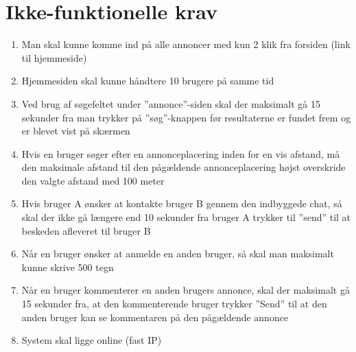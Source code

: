 \chapter{Ikke-funktionelle krav}

\begin{enumerate}
	\item Man skal kunne komme ind på alle annoncer med kun 2 klik fra forsiden (link til hjemmeside)
	
	\item Hjemmesiden skal kunne håndtere 10 brugere på samme tid
	
	\item Ved brug af søgefeltet under ''annonce''-siden skal der maksimalt gå 15 sekunder fra man trykker på ''søg''-knappen før resultaterne er fundet frem og er blevet vist på skærmen
	
	
	\item Hvis en bruger søger efter en annonceplacering inden for en vis afstand, må den maksimale afstand til den pågældende annonceplacering højst overskride den valgte afstand med 100 meter
	
	\item Hvis bruger A ønsker at kontakte bruger B gennem den indbyggede chat, så skal der ikke gå længere end 10 sekunder fra bruger A trykker til ''send'' til at beskeden afleveret til bruger B
	
	\item Når en bruger ønsker at anmelde en anden bruger, så skal man maksimalt kunne skrive 500 tegn
	
	\item Når en bruger kommenterer en anden brugers annonce, skal der maksimalt gå 15 sekunder fra, at den kommenterende bruger trykker ''Send'' til at den anden bruger kan se kommentaren på den pågældende annonce
	
	\item System skal ligge online (fast IP)
	
\end{enumerate}